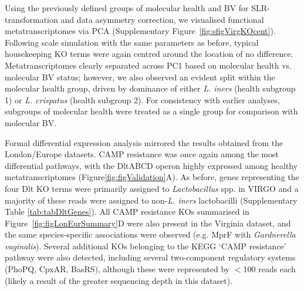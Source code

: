 \documentclass[sn-mathphys,Numbered]{sn-jnl}%
\begin{document}
Using the previously defined groups of molecular health and BV for SLR-transformation and data asymmetry correction, we visualised functional metatranscriptomes via PCA (Supplementary Figure~\ref{fig:sfigVirgKOcent}). Following scale simulation with the same parameters as before, typical housekeeping KO terms were again centred around the location of no difference. Metatranscriptomes clearly separated across PC1 based on molecular health vs. molecular BV status; however, we also observed an evident split within the molecular health group, driven by dominance of either \textit{L. iners} (health subgroup 1) or \textit{L. crispatus} (health subgroup 2). For consistency with earlier analyses, subgroups of molecular health were treated as a single group for comparison with molecular BV.

Formal differential expression analysis mirrored the results obtained from the London/Europe datasets. CAMP resistance was once again among the most differential pathways, with the DltABCD operon highly expressed among healthy metatranscriptomes (Figure\ref{fig:figValidation}A). As before, genes representing the four Dlt KO terms were primarily assigned to \textit{Lactobacillus} spp. in VIRGO and a majority of these reads were assigned to non-\textit{L. iners} lactobacilli (Supplementary Table \ref{tab:tabDltGenes}). All CAMP resistance KOs summarised in Figure~\ref{fig:figLonEurSummary}D were also present in the Virginia dataset, and the same species-specific associations were observed (e.g. MprF with \textit{Gardnerella vaginalis}). Several additional KOs belonging to the KEGG `CAMP resistance' pathway were also detected, including several two-component regulatory systems (PhoPQ, CpxAR, BasRS), although these were represented by $<$100 reads each (likely a result of the greater sequencing depth in this dataset).
\end{document}
